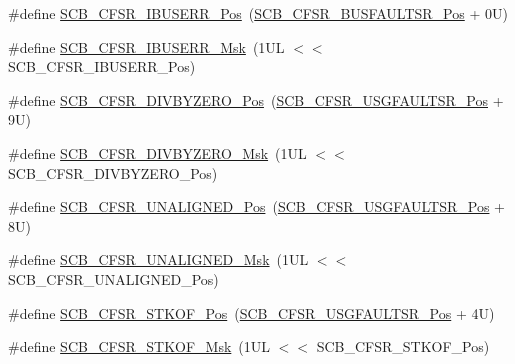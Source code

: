 \begin{DoxyCompactItemize}
\item 
\#define \mbox{\hyperlink{group___c_m_s_i_s___s_c_b_gad01f4e7c1daa67e2ca8eb4411fd80df4}{S\+C\+B\+\_\+\+C\+F\+S\+R\+\_\+\+I\+B\+U\+S\+E\+R\+R\+\_\+\+Pos}}~(\mbox{\hyperlink{group___c_m_s_i_s___s_c_b_ga555a24f4f57d199f91d1d1ab7c8c3c8a}{S\+C\+B\+\_\+\+C\+F\+S\+R\+\_\+\+B\+U\+S\+F\+A\+U\+L\+T\+S\+R\+\_\+\+Pos}} + 0\+U)
\item 
\#define \mbox{\hyperlink{group___c_m_s_i_s___s_c_b_ga2a0907c95aabc4b9d77c3e28d14a717f}{S\+C\+B\+\_\+\+C\+F\+S\+R\+\_\+\+I\+B\+U\+S\+E\+R\+R\+\_\+\+Msk}}~(1\+U\+L $<$$<$ S\+C\+B\+\_\+\+C\+F\+S\+R\+\_\+\+I\+B\+U\+S\+E\+R\+R\+\_\+\+Pos)
\item 
\#define \mbox{\hyperlink{group___c_m_s_i_s___s_c_b_gaa8fc61d57be3e94db000367f521aa1fc}{S\+C\+B\+\_\+\+C\+F\+S\+R\+\_\+\+D\+I\+V\+B\+Y\+Z\+E\+R\+O\+\_\+\+Pos}}~(\mbox{\hyperlink{group___c_m_s_i_s___s_c_b_gac8e4197b295c8560e68e2d71285c7879}{S\+C\+B\+\_\+\+C\+F\+S\+R\+\_\+\+U\+S\+G\+F\+A\+U\+L\+T\+S\+R\+\_\+\+Pos}} + 9\+U)
\item 
\#define \mbox{\hyperlink{group___c_m_s_i_s___s_c_b_ga9d91a0850b4962ad1335b2eadac6777e}{S\+C\+B\+\_\+\+C\+F\+S\+R\+\_\+\+D\+I\+V\+B\+Y\+Z\+E\+R\+O\+\_\+\+Msk}}~(1\+U\+L $<$$<$ S\+C\+B\+\_\+\+C\+F\+S\+R\+\_\+\+D\+I\+V\+B\+Y\+Z\+E\+R\+O\+\_\+\+Pos)
\item 
\#define \mbox{\hyperlink{group___c_m_s_i_s___s_c_b_ga8836da99a7e569d7a5a79ab4eaa85690}{S\+C\+B\+\_\+\+C\+F\+S\+R\+\_\+\+U\+N\+A\+L\+I\+G\+N\+E\+D\+\_\+\+Pos}}~(\mbox{\hyperlink{group___c_m_s_i_s___s_c_b_gac8e4197b295c8560e68e2d71285c7879}{S\+C\+B\+\_\+\+C\+F\+S\+R\+\_\+\+U\+S\+G\+F\+A\+U\+L\+T\+S\+R\+\_\+\+Pos}} + 8\+U)
\item 
\#define \mbox{\hyperlink{group___c_m_s_i_s___s_c_b_gac7d2aa508a08a2cab97aa8683c87d125}{S\+C\+B\+\_\+\+C\+F\+S\+R\+\_\+\+U\+N\+A\+L\+I\+G\+N\+E\+D\+\_\+\+Msk}}~(1\+U\+L $<$$<$ S\+C\+B\+\_\+\+C\+F\+S\+R\+\_\+\+U\+N\+A\+L\+I\+G\+N\+E\+D\+\_\+\+Pos)
\item 
\#define \mbox{\hyperlink{group___c_m_s_i_s___s_c_b_ga35d4221dbc3b9ec07aa5eb66d3497d7f}{S\+C\+B\+\_\+\+C\+F\+S\+R\+\_\+\+S\+T\+K\+O\+F\+\_\+\+Pos}}~(\mbox{\hyperlink{group___c_m_s_i_s___s_c_b_gac8e4197b295c8560e68e2d71285c7879}{S\+C\+B\+\_\+\+C\+F\+S\+R\+\_\+\+U\+S\+G\+F\+A\+U\+L\+T\+S\+R\+\_\+\+Pos}} + 4\+U)
\item 
\#define \mbox{\hyperlink{group___c_m_s_i_s___s_c_b_gae0b3bb3653d904169486e2d4efe4c566}{S\+C\+B\+\_\+\+C\+F\+S\+R\+\_\+\+S\+T\+K\+O\+F\+\_\+\+Msk}}~(1\+U\+L $<$$<$ S\+C\+B\+\_\+\+C\+F\+S\+R\+\_\+\+S\+T\+K\+O\+F\+\_\+\+Pos)

\end{DoxyCompactItemize}

